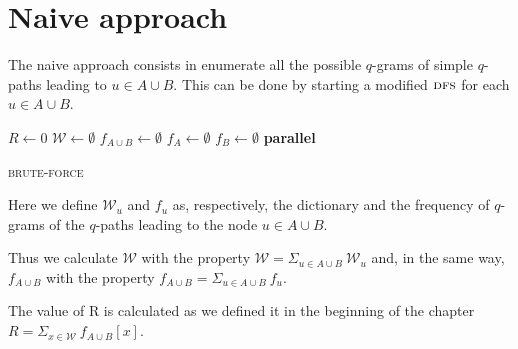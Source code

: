 \section{Naive approach}

	The naive approach consists in enumerate all the possible $q$-grams of simple $q$-paths leading to $u \in A \cup B$. 
	This can be done by starting a modified $\textsc{dfs}$ for each $u \in A \cup B$.
	
    \begin{algorithm}[h]
    \small
    \DontPrintSemicolon
    \BlankLine
    $R \gets 0$\;
	$\mathcal{W} \gets \emptyset$\;
	$f_{A \cup B} \gets \emptyset$ \quad \;    
	$f_{A} \gets \emptyset$\; 
	$f_{B} \gets \emptyset$\; 
	\BlankLine
    \textbf{parallel} 
	\BlankLine    
	\BlankLine
    \caption{\textsc{brute-force}}
    \label{alg:brute-force}
    \end{algorithm}

	Here we define $\mathcal{W}_{u}$ and $f_{u}$ as, respectively, the dictionary and the frequency of $q$-grams of the $q$-paths leading to the node $u \in A \cup B$.
	 
	Thus we calculate $\mathcal{W}$ with the property $\mathcal{W} = \Sigma_{u \in A \cup B}{\ \mathcal{W}_{u} }$ and, in the same way, $f_{A \cup B}$ with the property
	$f_{A \cup B} = \Sigma_{u \in A \cup B}{\ f_{u} }$.
	
	The value of R is calculated as we defined it in the beginning of the chapter $R = \Sigma_{x \in \mathcal{W} }{\ f_{A \cup B}[x] }$.

